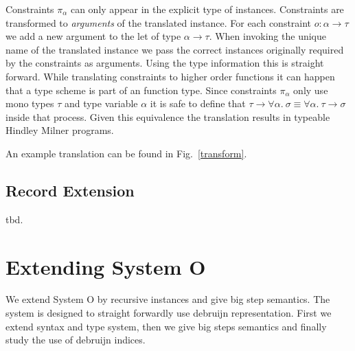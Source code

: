 \documentclass[runningheads]{llncs}
\begin{document}
Constraints $\pi_\alpha$ can only appear in the explicit type of instances. Constraints are transformed to \emph{arguments} of the translated instance. For each constraint $o : \alpha \rightarrow \tau$ we add a new argument to the let of type $\alpha \rightarrow \tau$. When invoking the unique name of the translated instance we pass the correct instances originally required by the constraints as arguments. Using the type information this is straight forward. While translating constraints to higher order functions it can happen that a type scheme is part of an function type. Since constraints $\pi_\alpha$ only use mono types $\tau$ and type variable $\alpha$ it is safe to define that $\tau \rightarrow \forall \alpha. \ \sigma \equiv \forall \alpha. \ \tau \rightarrow \sigma$ inside that process. Given this equivalence the translation results in typeable Hindley Milner programs.

An example translation can be found in Fig.~\ref{transform}.

\subsection{Record Extension}
tbd.

\section{Extending System O}
We extend System O by recursive instances and give big step semantics. The system is designed to straight forwardly use debruijn representation. First we extend syntax and type system, then we give big steps semantics and finally study the use of debruijn indices. 
\end{document}
